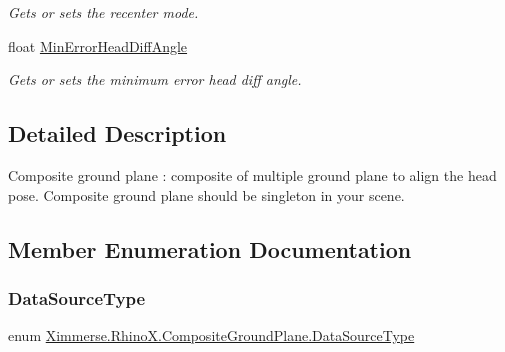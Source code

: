 \begin{DoxyCompactItemize}
\begin{DoxyCompactList}\small\item\em Gets or sets the recenter mode. \end{DoxyCompactList}\item 
float \mbox{\hyperlink{class_ximmerse_1_1_rhino_x_1_1_composite_ground_plane_acf419166400b8b26286ec73097dd7ee8}{Min\+Error\+Head\+Diff\+Angle}}
\begin{DoxyCompactList}\small\item\em Gets or sets the minimum error head diff angle. \end{DoxyCompactList}\end{DoxyCompactItemize}


\subsection{Detailed Description}
Composite ground plane \+: composite of multiple ground plane to align the head pose. Composite ground plane should be singleton in your scene. 



\subsection{Member Enumeration Documentation}
\mbox{\label{class_ximmerse_1_1_rhino_x_1_1_composite_ground_plane_aeb2c4782a573590b210966a4def66f33}} 
\subsubsection{\texorpdfstring{Data\+Source\+Type}{DataSourceType}}
{\footnotesize\ttfamily enum \mbox{\hyperlink{class_ximmerse_1_1_rhino_x_1_1_composite_ground_plane_aeb2c4782a573590b210966a4def66f33}{Ximmerse.\+Rhino\+X.\+Composite\+Ground\+Plane.\+Data\+Source\+Type}}\hspace{0.3cm}{\ttfamily [strong]}}

